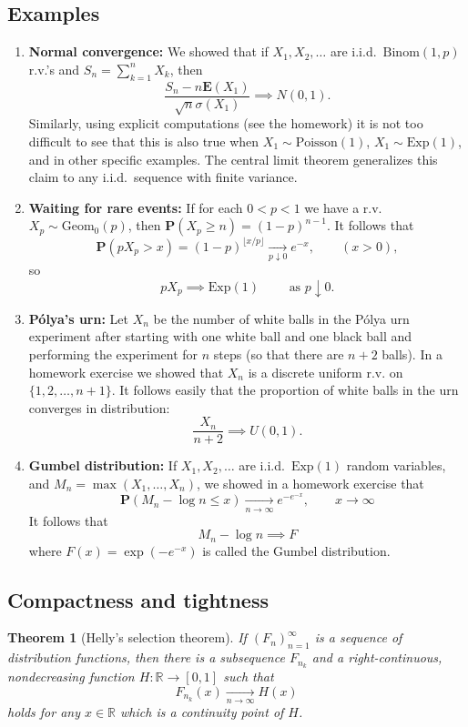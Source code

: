 \documentclass[12pt]{article}
\newtheorem{thm}{Theorem}[section]
\newcommand{\R}{\mathbb{R}}
\newcommand{\prob}{\mathbf{P}}
\newcommand{\expec}{\mathbf{E}}
\theoremstyle{example}
\begin{document}
\subsection{Examples}

\begin{enumerate}
\item \textbf{Normal convergence:} We showed that if $X_1,X_2,\ldots $ are i.i.d.\ $\textrm{Binom}(1,p)$ r.v.'s and $S_n=\sum_{k=1}^n X_k$, then
$$ \frac{S_n-n \expec(X_1)}{\sqrt{n} \sigma(X_1)} \implies N(0,1). $$
Similarly, using explicit computations (see the homework) it is not too difficult to see that this is also true when $X_1\sim \textrm{Poisson}(1)$, $X_1 \sim \textrm{Exp}(1)$, and in other specific examples. The central limit theorem generalizes this claim to any i.i.d.\ sequence with finite variance.
\item \textbf{Waiting for rare events:} If for each $0<p<1$ we have a r.v. $X_p \sim \textrm{Geom}_0(p)$, then $\prob(X_p \ge n) = (1-p)^{n-1}$. It follows that
$$ \prob(p X_p > x) = (1-p)^{\lfloor x/p \rfloor} \xrightarrow[p\downarrow 0]{} e^{-x}, \qquad (x > 0),$$
so $$ p X_p \implies \textrm{Exp}(1)\qquad \textrm{ as }p\downarrow 0. $$
\item \textbf{P\'olya's urn:} Let $X_n$ be the number of white balls in the P\'olya urn experiment after starting with one white ball and one black ball and performing the experiment for $n$ steps (so that there are $n+2$ balls). In a homework exercise we showed that $X_n$ is a discrete uniform r.v. on $\{1,2,\ldots,n+1\}$. It follows easily that
the proportion of white balls in the urn converges in distribution:
$$ \frac{X_n}{n+2} \implies U(0,1). $$
\item \textbf{Gumbel distribution:} If $X_1,X_2,\ldots$ are i.i.d.\ $\textrm{Exp}(1)$ random variables, and $M_n=\max(X_1,\ldots,X_n)$, we showed in a homework exercise that
$$ \prob(M_n-\log n \le x) \xrightarrow[n\to\infty]{} e^{-e^{-x}}, \qquad x\to\infty $$
It follows that
$$ M_n-\log n \implies F $$
where $F(x) = \exp\left(-e^{-x}\right)$ is called the Gumbel distribution.
\end{enumerate}


\subsection{Compactness and tightness}

\begin{thm}[Helly's selection theorem] If $(F_n)_{n=1}^\infty$ is a sequence of distribution functions, then there is a subsequence $F_{n_k}$ and a right-continuous, nondecreasing function $H:\R\to[0,1]$ such that 
$$ F_{n_k}(x)\xrightarrow[n\to\infty]{} H(x)$$
holds for any $x\in\R$ which is a continuity point of $H$.
\label{thm-helly}
\end{thm}
\end{document}
